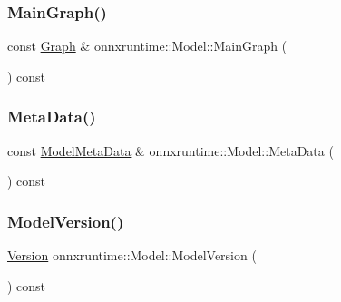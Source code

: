\subsubsection{\texorpdfstring{Main\+Graph()}{MainGraph()}\hspace{0.1cm}{\footnotesize\ttfamily [2/2]}}
{\footnotesize\ttfamily const \mbox{\hyperlink{classonnxruntime_1_1Graph}{Graph}} \& onnxruntime\+::\+Model\+::\+Main\+Graph (\begin{DoxyParamCaption}{ }\end{DoxyParamCaption}) const\hspace{0.3cm}{\ttfamily [noexcept]}}

\mbox{\label{classonnxruntime_1_1Model_a43f838a44bfe7970a114400006b54fe2}} 
\subsubsection{\texorpdfstring{Meta\+Data()}{MetaData()}}
{\footnotesize\ttfamily const \mbox{\hyperlink{namespaceonnxruntime_a13519c21da77ccc594726b670276a266}{Model\+Meta\+Data}} \& onnxruntime\+::\+Model\+::\+Meta\+Data (\begin{DoxyParamCaption}{ }\end{DoxyParamCaption}) const\hspace{0.3cm}{\ttfamily [noexcept]}}

\mbox{\label{classonnxruntime_1_1Model_abbcaaa6b05f740e6a309b1bd250f2e2a}} 
\subsubsection{\texorpdfstring{Model\+Version()}{ModelVersion()}}
{\footnotesize\ttfamily \mbox{\hyperlink{namespaceonnxruntime_ab7fae8d5830807c074def3bb8ae23cf1}{Version}} onnxruntime\+::\+Model\+::\+Model\+Version (\begin{DoxyParamCaption}{ }\end{DoxyParamCaption}) const}

\mbox{\label{classonnxruntime_1_1Model_a9c6d90551fa5943bcd70f43b84f9cb4c}} 
